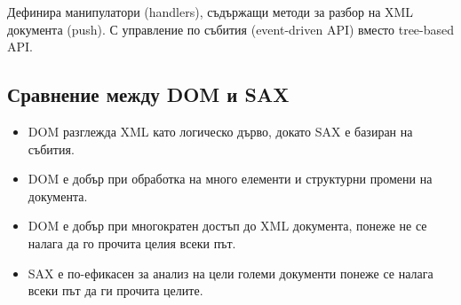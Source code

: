 \documentclass[fleqn,12pt]{article}
\begin{document}
Дефинира манипулатори (handlers), съдържащи методи за разбор на XML документа (push). С управление по събития (event-driven API) вместо tree-based API.

\subsection{Сравнение между DOM и SAX}

\begin{itemize}
    \item DOM разглежда XML като логическо дърво, докато SAX е базиран на събития.
    \item DOM е добър при обработка на много елементи и структурни промени на документа.
    \item DOM е добър при многократен достъп до XML документа, понеже не се налага да го прочита целия всеки път.
    \item SAX е по-ефикасен за анализ на цели големи документи понеже се налага всеки път да ги прочита целите.
\end{itemize}
\end{document}
